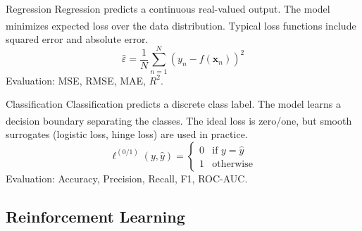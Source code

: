 \begin{v3topic}{Regression}
    Regression predicts a continuous real-valued output.
    The model minimizes expected loss over the data distribution\textsuperscript{\cite[][pp.~8--9]{iiiCourseMachineLearning}}.
    Typical loss functions include squared error and absolute error.
\visualseparator
    \begin{equation}
        \hat{\varepsilon} = \frac{1}{N}\sum_{n=1}^{N}(y_n - f(\mathbf{x}_n))^2
    \end{equation}
    Evaluation: MSE, RMSE, MAE, $R^2$.

\end{v3topic}
\begin{v3topic}{Classification}
    Classification predicts a discrete class label.
    The model learns a decision boundary separating the classes\textsuperscript{\cite[][pp.~10--12]{iiiCourseMachineLearning}}.
    The ideal loss is zero/one, but smooth surrogates (logistic loss, hinge loss) are used in practice.
\visualseparator
    \begin{equation}
        \ell^{(0/1)}(y, \hat{y}) = \begin{cases} 0 & \text{if } y = \hat{y} \\ 1 & \text{otherwise} \end{cases}
    \end{equation}
    Evaluation: Accuracy, Precision, Recall, F1, ROC-AUC.
\end{v3topic}

\subsection{Reinforcement Learning}


